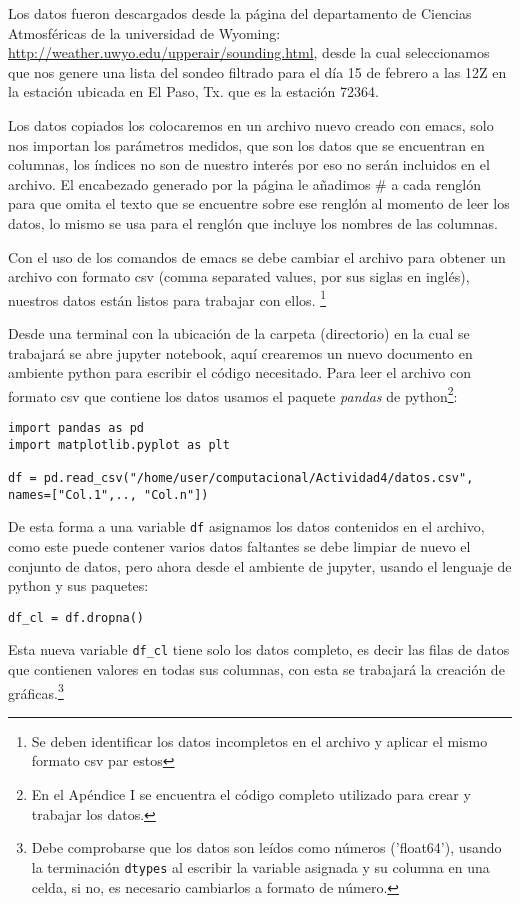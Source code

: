 Los datos fueron descargados desde la página del departamento de Ciencias Atmosféricas de la universidad de Wyoming: \url{http://weather.uwyo.edu/upperair/sounding.html}, desde la cual seleccionamos que nos genere una lista del sondeo filtrado para el día 15 de febrero a las 12Z en la estación ubicada en El Paso, Tx. que es la estación 72364.

Los datos copiados los colocaremos en un archivo nuevo creado con emacs, solo nos importan los parámetros medidos, que son los datos que se encuentran en columnas, los índices no son de nuestro interés por eso no serán incluidos en el archivo. El encabezado generado por la página le añadimos \#  a cada renglón para que omita el texto que se encuentre  sobre ese renglón al momento de leer los datos, lo mismo se usa para el renglón que incluye los nombres de las columnas. 

Con el uso de los comandos de emacs se debe cambiar el archivo para obtener un archivo con formato csv (comma separated values, por sus siglas en inglés), nuestros datos están listos para trabajar con ellos.
\footnotesize\footnote{Se deben identificar los datos incompletos en el archivo y aplicar el mismo formato csv par estos}

Desde una terminal con la ubicación de la carpeta (directorio) en la cual se trabajará se abre \textsf{jupyter notebook}, aquí crearemos un nuevo documento en ambiente python para escribir el código necesitado. Para leer el archivo con formato csv que contiene los datos usamos el paquete \textit{pandas} de python\footnote{En el Apéndice I se encuentra el código completo utilizado para crear y trabajar los datos.}:

\begin{verbatim}
import pandas as pd
import matplotlib.pyplot as plt

df = pd.read_csv("/home/user/computacional/Actividad4/datos.csv", 
names=["Col.1",.., "Col.n"])

\end{verbatim}
De esta forma a una variable \texttt{df} asignamos los datos contenidos en el archivo, como este puede contener varios datos faltantes se debe limpiar de nuevo el conjunto de datos, pero ahora desde el ambiente de jupyter, usando el lenguaje de python y sus paquetes: 

\verb#df_cl = df.dropna() #


Esta nueva variable \texttt{df\_cl} tiene solo los datos completo, es decir las filas de datos que contienen valores en todas sus columnas, con esta se trabajará la creación de gráficas.\footnotesize\footnote{Debe comprobarse que los datos son leídos como números ('float64'), usando la terminación \texttt{dtypes} al escribir la variable asignada y su columna en una celda, si no, es necesario cambiarlos a formato de número.}

